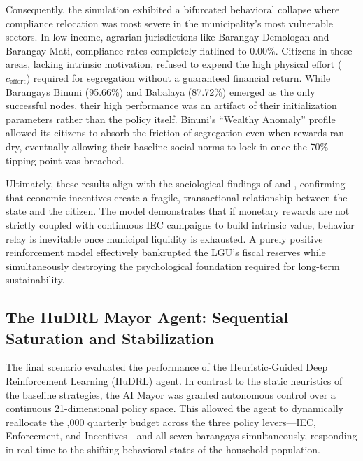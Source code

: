 Consequently, the simulation exhibited a bifurcated behavioral collapse where compliance relocation was most severe in the municipality's most vulnerable sectors. In low-income, agrarian jurisdictions like Barangay Demologan and Barangay Mati, compliance rates completely flatlined to 0.00\%. Citizens in these areas, lacking intrinsic motivation, refused to expend the high physical effort ($c_{\text{effort}}$) required for segregation without a guaranteed financial return. While Barangays Binuni (95.66\%) and Babalaya (87.72\%) emerged as the only successful nodes, their high performance was an artifact of their initialization parameters rather than the policy itself. Binuni's ``Wealthy Anomaly'' profile allowed its citizens to absorb the friction of segregation even when rewards ran dry, eventually allowing their baseline social norms to lock in once the 70\% tipping point was breached.

Ultimately, these results align with the sociological findings of \citet{Camarillo2021} and \citet{Zhao2022}, confirming that economic incentives create a fragile, transactional relationship between the state and the citizen. The model demonstrates that if monetary rewards are not strictly coupled with continuous IEC campaigns to build intrinsic value, behavior relay is inevitable once municipal liquidity is exhausted. A purely positive reinforcement model effectively bankrupted the LGU's fiscal reserves while simultaneously destroying the psychological foundation required for long-term sustainability.


\subsection{The HuDRL Mayor Agent: Sequential Saturation and Stabilization}
The final scenario evaluated the performance of the Heuristic-Guided Deep Reinforcement Learning (HuDRL) agent. In contrast to the static heuristics of the baseline strategies, the AI Mayor was granted autonomous control over a continuous 21-dimensional policy space. This allowed the agent to dynamically reallocate the ,000 quarterly budget across the three policy levers—IEC, Enforcement, and Incentives—and all seven barangays simultaneously, responding in real-time to the shifting behavioral states of the household population.

